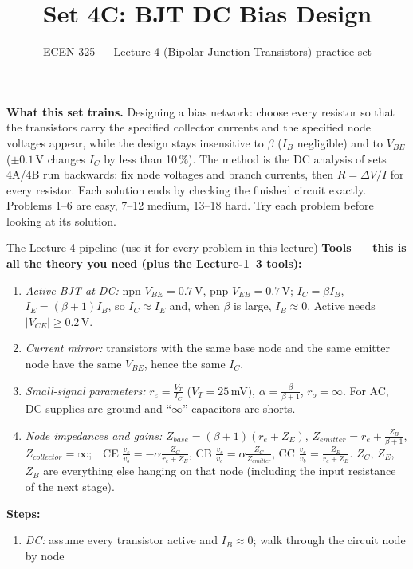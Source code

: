 \documentclass[11pt]{article}
\title{Set 4C: BJT DC Bias Design}
\author{ECEN 325 --- Lecture 4 (Bipolar Junction Transistors) practice set}
\date{}
\begin{document}
\maketitle

\textbf{What this set trains.} Designing a bias network: choose every resistor so that the transistors carry the
specified collector currents and the specified node voltages appear, while the design stays insensitive to $\beta$
($I_B$ negligible) and to $V_{BE}$ ($\pm0.1$\,V changes $I_C$ by less than 10\,\%). The method is the DC analysis of
sets 4A/4B run backwards: fix node voltages and branch currents, then $R=\Delta V/I$ for every resistor. Each solution
ends by checking the finished circuit exactly. Problems 1--6 are easy, 7--12 medium, 13--18 hard. Try each problem
before looking at its solution.


\begin{cardbox}{The Lecture-4 pipeline (use it for every problem in this lecture)}
\textbf{Tools --- this is all the theory you need (plus the Lecture-1--3 tools):}
\begin{enumerate}[label=\textbf{T\arabic*},leftmargin=2.2em,itemsep=1pt]
\item \emph{Active BJT at DC:} npn $V_{BE}=0.7$\,V, pnp $V_{EB}=0.7$\,V; $I_C=\beta I_B$, $I_E=(\beta+1)I_B$, so
      $I_C\approx I_E$ and, when $\beta$ is large, $I_B\approx 0$. Active needs $|V_{CE}|\ge 0.2$\,V.
\item \emph{Current mirror:} transistors with the same base node and the same emitter node have the same $V_{BE}$,
      hence the same $I_C$.
\item \emph{Small-signal parameters:} $r_e = \frac{V_T}{I_C}$ ($V_T=25$\,mV), $\alpha=\frac{\beta}{\beta+1}$, $r_o=\infty$.
      For AC, DC supplies are ground and ``$\infty$'' capacitors are shorts.
\item \emph{Node impedances and gains:} $Z_{base}=(\beta+1)(r_e+Z_E)$, $Z_{emitter}=r_e+\frac{Z_B}{\beta+1}$,
      $Z_{collector}=\infty$;\ \ CE $\frac{v_c}{v_b}=-\alpha\frac{Z_C}{r_e+Z_E}$, CB $\frac{v_c}{v_e}=\alpha\frac{Z_C}{Z_{emitter}}$,
      CC $\frac{v_e}{v_b}=\frac{Z_E}{r_e+Z_E}$. $Z_C$, $Z_E$, $Z_B$ are everything else hanging on that node
      (including the input resistance of the next stage).
\end{enumerate}
\textbf{Steps:}
\begin{enumerate}[leftmargin=2.2em,itemsep=1pt]
\item \emph{DC:} assume every transistor active and $I_B\approx0$; walk through the circuit node by node

\end{enumerate}
\end{cardbox}
\end{document}
